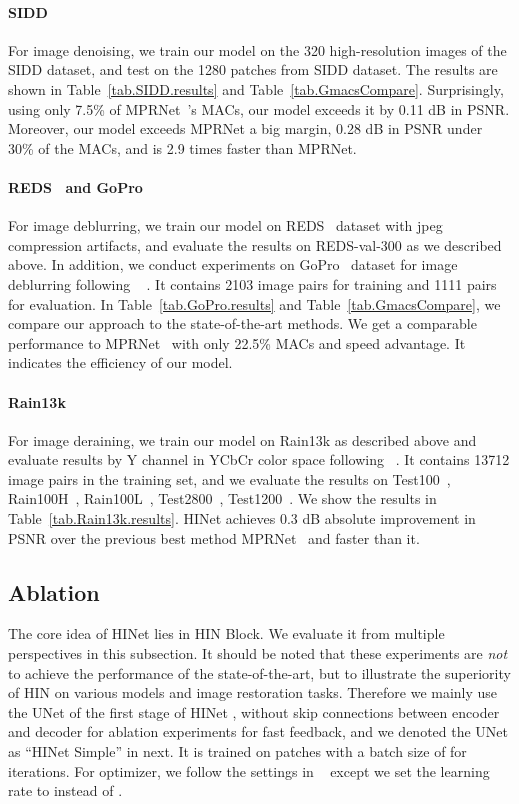 \documentclass[final]{cvpr}
\begin{document}
\paragraph{SIDD~\cite{abdelhamed2018high}} For image denoising, we train our model on the 320 high-resolution images of the SIDD dataset, and test on the 1280 patches from SIDD dataset. The results are shown in Table~\ref{tab.SIDD.results} and Table~\ref{tab.GmacsCompare}. Surprisingly, using only 7.5\% of MPRNet~\cite{Zamir2021MPRNet}'s MACs, our model exceeds it by 0.11 dB in PSNR. Moreover, our model exceeds MPRNet a big margin, 0.28 dB in PSNR under 30\% of the MACs, and is 2.9 times faster than MPRNet.


\paragraph{REDS~\cite{nah2019ntire} and GoPro~\cite{nah2017deep}} For image deblurring, we train our model on REDS~\cite{nah2019ntire} dataset with jpeg compression artifacts, and evaluate the results on REDS-val-300 as we described above. In addition, we conduct experiments on GoPro~\cite{nah2017deep} dataset for image deblurring following ~\cite{Zamir2021MPRNet,Zhang_2019_CVPR} \etc. It contains 2103 image pairs for training and 1111 pairs for evaluation. In Table~\ref{tab.GoPro.results} and Table~\ref{tab.GmacsCompare}, we compare our approach to the state-of-the-art methods. We get a comparable performance to MPRNet~\cite{Zamir2021MPRNet} with only 22.5\% MACs and  speed advantage. It indicates the efficiency of our model. 

\paragraph{Rain13k} For image deraining, we train our model on Rain13k as described above and evaluate results by Y channel in YCbCr color space following ~\cite{jiang2020multi,Zamir2021MPRNet}. It contains 13712 image pairs in the training set, and we evaluate the results on Test100~\cite{zhang2019image}, Rain100H~\cite{yang2017deep}, Rain100L~\cite{yang2017deep}, Test2800~\cite{fu2017removing}, Test1200~\cite{zhang2018density}. We show the results in Table~\ref{tab.Rain13k.results}. HINet achieves 0.3 dB absolute improvement in PSNR over the previous best method MPRNet~\cite{Zamir2021MPRNet} and  faster than it.

\subsection{Ablation}The core idea of HINet lies in HIN Block. We evaluate it from multiple perspectives in this subsection.
It should be noted that these experiments are \emph{not} to achieve the performance of the state-of-the-art, but to illustrate the superiority of HIN on various models and image restoration tasks.
Therefore we mainly use the UNet of the first stage of HINet , without skip connections between encoder and decoder for ablation experiments for fast feedback, and we denoted the UNet as ``HINet Simple'' in next. It is trained on  patches with a batch size of  for  iterations. For optimizer, we follow the settings in ~\cite{Zamir2021MPRNet} except we set the learning rate to  instead of .
\end{document}

